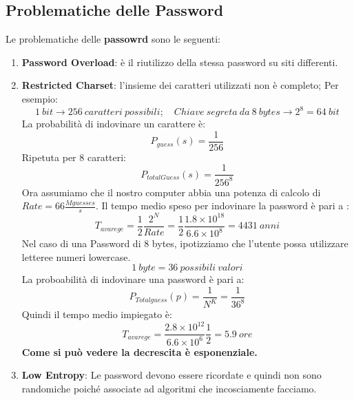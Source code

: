 \documentclass{article}
\theoremstyle{remark}
\begin{document}
\subsection{Problematiche delle Password}
Le problematiche delle \textbf{passowrd} sono le seguenti:
\begin{enumerate}
	\item \textbf{Password Overload}: è il riutilizzo della stessa password su siti differenti.
	\item \textbf{Restricted Charset}: l'insieme dei caratteri utilizzati non è completo;
	      Per esempio:\begin{equation*}
		      1\ bit\rightarrow 256\ caratteri\ possibili;\quad Chiave\ segreta\ da\ 8\ bytes\rightarrow 2^8=64\ bit
	      \end{equation*}
	      La probabilità di indovinare un carattere è:
	      \begin{equation*}
		      P_{guess}(s)=\frac{1}{256}
	      \end{equation*}
	      Ripetuta per 8 caratteri:\begin{equation*}
		      P_{totalGuess}(s)=\frac{1}{256^8}
	      \end{equation*} Ora assumiamo che il nostro computer abbia una potenza di calcolo di $Rate=66\frac{Mguesses}{s}$. Il tempo medio speso per indovinare la password è pari a :
	      \begin{equation*}
		      T_{avarege}=\frac{1}{2}\frac{2^N}{Rate}=\frac{1}{2}\frac{1.8\times10^{18}}{6.6\times10^{8}}=4431\ anni
	      \end{equation*}
	      Nel caso di una Password di 8 bytes, ipotizziamo che l'utente possa utilizzare letteree  numeri lowercase.\begin{equation*}
		      1\ byte= 36\ possibili\ valori
	      \end{equation*}
	      La proboabilità di indovinare una password è pari a:
	      \begin{equation*}
		      P_{Totalguess}(p)=\frac{1}{N^K}=\frac{1}{36^8}
	      \end{equation*}
	      Quindi il tempo medio impiegato è:
	      \begin{equation*}
		      T_{avarege}=\frac{2.8\times10^12}{6.6\times10^6}\frac{1}{2}=5.9\ ore
	      \end{equation*}
	      \textbf{Come si può vedere la decrescita è esponenziale.}
	\item \textbf{Low Entropy}: Le password devono essere ricordate e quindi non sono randomiche poiché associate ad algoritmi che incosciamente facciamo.

\end{enumerate}
\end{document}
